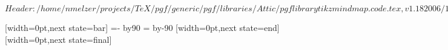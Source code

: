 %
%
%

\ProvidesFileRCS[v\pgfversion] $Header: /home/nmelzer/projects/TeX/pgf/generic/pgf/libraries/Attic/pgflibrarytikzmindmap.code.tex,v 1.18 2006/11/24 08:59:11 tantau Exp $



%

{
  [width=0pt,next state=bar]
  {
    {
    \pgftransformxshift{-\pgfsnakecirclestartradius}%
    \pgfpathmoveto{\pgfpointpolar{\pgfsnakesegmentangle}{\pgfsnakecirclestartradius}}
    \pgfpatharc{\pgfsnakesegmentangle}{-\pgfsnakesegmentangle}{\pgfsnakecirclestartradius}
    \@tempcnta=-\pgfsnakesegmentangle\relax
    \advance\@tempcnta by90\relax
    \setlength\@tempdima{\pgfsnakecirclestartradius}
    \setlength\@tempdimb{\pgfsnakesegmentamplitude}
    \pgfpathcurveto
    {\pgfpointadd
      {\pgfpointpolar{-\pgfsnakesegmentangle}{\pgfsnakecirclestartradius}}
      {}}
    {}
    {}
    \@tempcnta=\pgfsnakesegmentangle\relax
    \advance\@tempcnta by-90\relax
    \pgfpathcurveto
    {}
    {\pgfpointadd
      {\pgfpointpolar{\pgfsnakesegmentangle}{\pgfsnakecirclestartradius}}
      {}}
    {\pgfpointpolar{\pgfsnakesegmentangle}{\pgfsnakecirclestartradius}}
    \pgfpathclose
    }
  }
  [width=0pt,next state=end]
  {
    \setlength\@tempdima{\pgfsnakecirclestartradius}%
    \setlength\@tempdimb{\pgfsnakecircleendradius}%
    \setlength\pgf@xc{\pgfsnakesegmentamplitude}%
    \pgfpathrectangle
    {}
    {}
  }
  [width=0pt,next state=final]
  {
    {
    \pgftransformxshift{\pgfsnakeremainingdistance}%
    \pgftransformxshift{-\pgfsnakecircleendradius}%
    \pgfpathmoveto{\pgfpointpolar{\pgfsnakesegmentangle}{\pgfsnakecircleendradius}}
    \pgfpatharc{\pgfsnakesegmentangle}{-\pgfsnakesegmentangle}{\pgfsnakecircleendradius}
}}}
